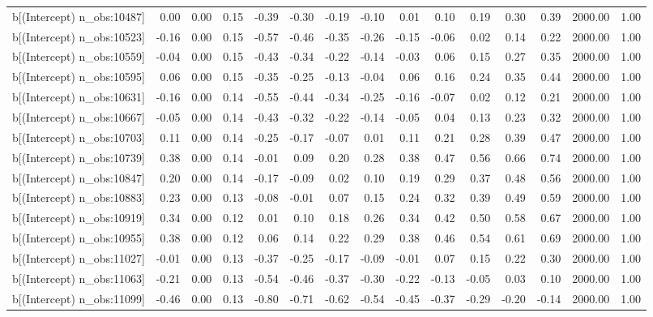 \begin{table}[ht]
\begin{tabular}{rrrrrrrrrrrrrrr}
  b[(Intercept) n\_obs:10487] & 0.00 & 0.00 & 0.15 & -0.39 & -0.30 & -0.19 & -0.10 & 0.01 & 0.10 & 0.19 & 0.30 & 0.39 & 2000.00 & 1.00 \\ 
  b[(Intercept) n\_obs:10523] & -0.16 & 0.00 & 0.15 & -0.57 & -0.46 & -0.35 & -0.26 & -0.15 & -0.06 & 0.02 & 0.14 & 0.22 & 2000.00 & 1.00 \\ 
  b[(Intercept) n\_obs:10559] & -0.04 & 0.00 & 0.15 & -0.43 & -0.34 & -0.22 & -0.14 & -0.03 & 0.06 & 0.15 & 0.27 & 0.35 & 2000.00 & 1.00 \\ 
  b[(Intercept) n\_obs:10595] & 0.06 & 0.00 & 0.15 & -0.35 & -0.25 & -0.13 & -0.04 & 0.06 & 0.16 & 0.24 & 0.35 & 0.44 & 2000.00 & 1.00 \\ 
  b[(Intercept) n\_obs:10631] & -0.16 & 0.00 & 0.14 & -0.55 & -0.44 & -0.34 & -0.25 & -0.16 & -0.07 & 0.02 & 0.12 & 0.21 & 2000.00 & 1.00 \\ 
  b[(Intercept) n\_obs:10667] & -0.05 & 0.00 & 0.14 & -0.43 & -0.32 & -0.22 & -0.14 & -0.05 & 0.04 & 0.13 & 0.23 & 0.32 & 2000.00 & 1.00 \\ 
  b[(Intercept) n\_obs:10703] & 0.11 & 0.00 & 0.14 & -0.25 & -0.17 & -0.07 & 0.01 & 0.11 & 0.21 & 0.28 & 0.39 & 0.47 & 2000.00 & 1.00 \\ 
  b[(Intercept) n\_obs:10739] & 0.38 & 0.00 & 0.14 & -0.01 & 0.09 & 0.20 & 0.28 & 0.38 & 0.47 & 0.56 & 0.66 & 0.74 & 2000.00 & 1.00 \\ 
  b[(Intercept) n\_obs:10847] & 0.20 & 0.00 & 0.14 & -0.17 & -0.09 & 0.02 & 0.10 & 0.19 & 0.29 & 0.37 & 0.48 & 0.56 & 2000.00 & 1.00 \\ 
  b[(Intercept) n\_obs:10883] & 0.23 & 0.00 & 0.13 & -0.08 & -0.01 & 0.07 & 0.15 & 0.24 & 0.32 & 0.39 & 0.49 & 0.59 & 2000.00 & 1.00 \\ 
  b[(Intercept) n\_obs:10919] & 0.34 & 0.00 & 0.12 & 0.01 & 0.10 & 0.18 & 0.26 & 0.34 & 0.42 & 0.50 & 0.58 & 0.67 & 2000.00 & 1.00 \\ 
  b[(Intercept) n\_obs:10955] & 0.38 & 0.00 & 0.12 & 0.06 & 0.14 & 0.22 & 0.29 & 0.38 & 0.46 & 0.54 & 0.61 & 0.69 & 2000.00 & 1.00 \\ 
  b[(Intercept) n\_obs:11027] & -0.01 & 0.00 & 0.13 & -0.37 & -0.25 & -0.17 & -0.09 & -0.01 & 0.07 & 0.15 & 0.22 & 0.30 & 2000.00 & 1.00 \\ 
  b[(Intercept) n\_obs:11063] & -0.21 & 0.00 & 0.13 & -0.54 & -0.46 & -0.37 & -0.30 & -0.22 & -0.13 & -0.05 & 0.03 & 0.10 & 2000.00 & 1.00 \\ 
  b[(Intercept) n\_obs:11099] & -0.46 & 0.00 & 0.13 & -0.80 & -0.71 & -0.62 & -0.54 & -0.45 & -0.37 & -0.29 & -0.20 & -0.14 & 2000.00 & 1.00 \\ 

\end{tabular}
\end{table}
